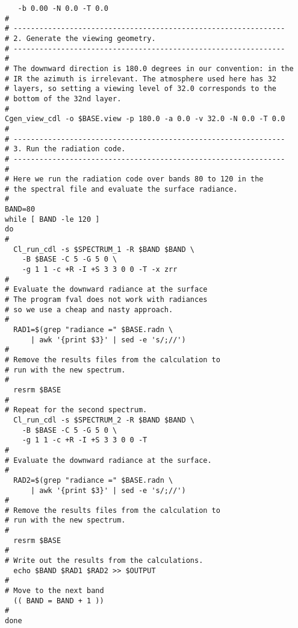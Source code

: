 {\begin{verbatim}
   -b 0.00 -N 0.0 -T 0.0
#
# ---------------------------------------------------------------
# 2. Generate the viewing geometry.
# ---------------------------------------------------------------
#
# The downward direction is 180.0 degrees in our convention: in the
# IR the azimuth is irrelevant. The atmosphere used here has 32
# layers, so setting a viewing level of 32.0 corresponds to the
# bottom of the 32nd layer.
#
Cgen_view_cdl -o $BASE.view -p 180.0 -a 0.0 -v 32.0 -N 0.0 -T 0.0
#
# ---------------------------------------------------------------
# 3. Run the radiation code.
# ---------------------------------------------------------------
#
# Here we run the radiation code over bands 80 to 120 in the
# the spectral file and evaluate the surface radiance.
#
BAND=80
while [ BAND -le 120 ]
do
#
  Cl_run_cdl -s $SPECTRUM_1 -R $BAND $BAND \
    -B $BASE -C 5 -G 5 0 \
    -g 1 1 -c +R -I +S 3 3 0 0 -T -x zrr
#
# Evaluate the downward radiance at the surface
# The program fval does not work with radiances
# so we use a cheap and nasty approach.
#
  RAD1=$(grep "radiance =" $BASE.radn \
      | awk '{print $3}' | sed -e 's/;//')
#
# Remove the results files from the calculation to
# run with the new spectrum.
#
  resrm $BASE
#
# Repeat for the second spectrum.
  Cl_run_cdl -s $SPECTRUM_2 -R $BAND $BAND \
    -B $BASE -C 5 -G 5 0 \
    -g 1 1 -c +R -I +S 3 3 0 0 -T
#
# Evaluate the downward radiance at the surface.
#
  RAD2=$(grep "radiance =" $BASE.radn \
      | awk '{print $3}' | sed -e 's/;//')
#
# Remove the results files from the calculation to
# run with the new spectrum.
#
  resrm $BASE
#
# Write out the results from the calculations.
  echo $BAND $RAD1 $RAD2 >> $OUTPUT
#
# Move to the next band
  (( BAND = BAND + 1 ))
#
done
\end{verbatim}
}

